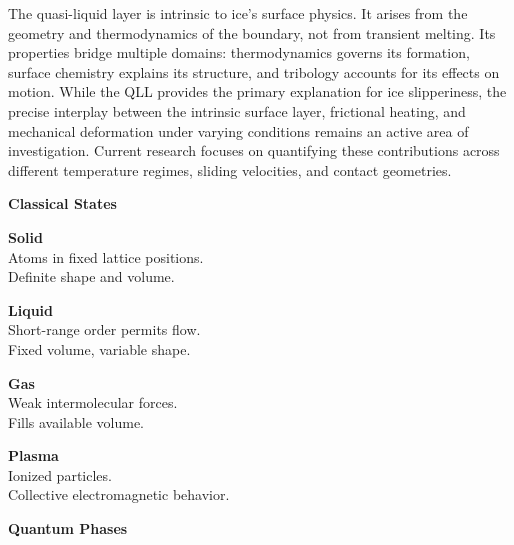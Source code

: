 The quasi-liquid layer is intrinsic to ice's surface physics. It arises from the geometry and thermodynamics of the boundary, not from transient melting. Its properties bridge multiple domains: thermodynamics governs its formation, surface chemistry explains its structure, and tribology accounts for its effects on motion. While the QLL provides the primary explanation for ice slipperiness, the precise interplay between the intrinsic surface layer, frictional heating, and mechanical deformation under varying conditions remains an active area of investigation. Current research focuses on quantifying these contributions across different temperature regimes, sliding velocities, and contact geometries.
\newpage

\begin{tcolorbox}[
  enhanced,
  colback=blue!2,
  colframe=blue!35,
  coltitle=white,
  fonttitle=\bfseries\Large,
  title={Phases of Matter},
  attach boxed title to top center={yshift=-2mm},
  boxed title style={colback=blue!35, sharp corners},
  arc=0mm,
  boxrule=0.5pt,
  left=6pt,
  right=6pt,
  top=6pt,
  bottom=6pt,
  width=\textwidth
]

\begin{multicols}{2}
\raggedright

\colorbox{blue!15}{\textbf{\large Classical States}}\vspace{3pt}

\textbf{Solid}\\
{\footnotesize Atoms in fixed lattice positions.\\Definite shape and volume.}\vspace{6pt}

\textbf{Liquid}\\
{\footnotesize Short-range order permits flow.\\Fixed volume, variable shape.}\vspace{6pt}

\textbf{Gas}\\
{\footnotesize Weak intermolecular forces.\\Fills available volume.}\vspace{6pt}

\textbf{Plasma}\\
{\footnotesize Ionized particles.\\Collective electromagnetic behavior.}\vspace{12pt}

\colorbox{blue!15}{\textbf{\large Quantum Phases}}\vspace{3pt}


\end{multicols}
\end{tcolorbox}
